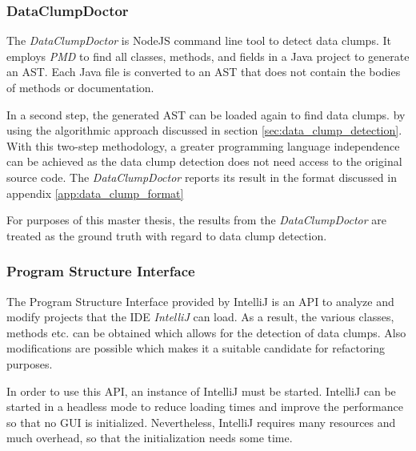 \subsubsection{DataClumpDoctor} \label{sec:data_clump_doctor}

The  \textit{DataClumpDoctor} is NodeJS command line tool  to detect data clumps. It employs \textit{PMD} to find all classes, methods, and fields in a Java project to generate an \ac{AST}. Each Java file is converted to an \ac{AST} that does not contain the bodies of methods or documentation.

In a second step, the generated \ac{AST} can be loaded again to find data clumps. by using the algorithmic approach discussed in section \ref{sec:data_clump_detection}. With this two-step methodology, a greater programming language independence can be achieved as the data clump detection does not need access to the original source code. The \textit{DataClumpDoctor} reports its result in the format discussed in appendix \ref{app:data_clump_format}

For purposes of this master thesis, the results from the \textit{DataClumpDoctor} are treated as the ground truth with regard to data clump detection. 

\subsubsection{ Program Structure Interface}\label{sec:psi}
The Program Structure Interface provided by IntelliJ is an \ac{API} to analyze and modify  projects that the \ac{IDE} \textit{IntelliJ} can load. As a result, the various classes, methods etc. can be obtained which allows for the detection of data clumps. Also modifications are possible which makes it a suitable candidate for refactoring purposes.

In order to use this API, an instance of IntelliJ must be started. IntelliJ can be started in a headless mode to reduce loading times and improve the performance so that no GUI is initialized. Nevertheless, IntelliJ requires many resources and much overhead, so that  the initialization needs some time.





